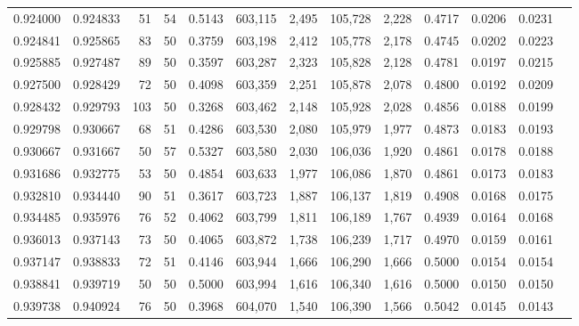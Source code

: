 \begin{tabular}{rrrrrrrrrrrrr}
0.924000 & 0.924833 &    51 &  54 &                                     0.5143 & 603,115 &   2,495 & 105,728 &   2,228 & 0.4717 & 0.0206 & 0.0231 \\
0.924841 & 0.925865 &    83 &  50 &                                     0.3759 & 603,198 &   2,412 & 105,778 &   2,178 & 0.4745 & 0.0202 & 0.0223 \\
0.925885 & 0.927487 &    89 &  50 &                                     0.3597 & 603,287 &   2,323 & 105,828 &   2,128 & 0.4781 & 0.0197 & 0.0215 \\
0.927500 & 0.928429 &    72 &  50 &                                     0.4098 & 603,359 &   2,251 & 105,878 &   2,078 & 0.4800 & 0.0192 & 0.0209 \\
0.928432 & 0.929793 &   103 &  50 &                                     0.3268 & 603,462 &   2,148 & 105,928 &   2,028 & 0.4856 & 0.0188 & 0.0199 \\
0.929798 & 0.930667 &    68 &  51 &                                     0.4286 & 603,530 &   2,080 & 105,979 &   1,977 & 0.4873 & 0.0183 & 0.0193 \\
0.930667 & 0.931667 &    50 &  57 &                                     0.5327 & 603,580 &   2,030 & 106,036 &   1,920 & 0.4861 & 0.0178 & 0.0188 \\
0.931686 & 0.932775 &    53 &  50 &                                     0.4854 & 603,633 &   1,977 & 106,086 &   1,870 & 0.4861 & 0.0173 & 0.0183 \\
0.932810 & 0.934440 &    90 &  51 &                                     0.3617 & 603,723 &   1,887 & 106,137 &   1,819 & 0.4908 & 0.0168 & 0.0175 \\
0.934485 & 0.935976 &    76 &  52 &                                     0.4062 & 603,799 &   1,811 & 106,189 &   1,767 & 0.4939 & 0.0164 & 0.0168 \\
0.936013 & 0.937143 &    73 &  50 &                                     0.4065 & 603,872 &   1,738 & 106,239 &   1,717 & 0.4970 & 0.0159 & 0.0161 \\
0.937147 & 0.938833 &    72 &  51 &                                     0.4146 & 603,944 &   1,666 & 106,290 &   1,666 & 0.5000 & 0.0154 & 0.0154 \\
0.938841 & 0.939719 &    50 &  50 &                                     0.5000 & 603,994 &   1,616 & 106,340 &   1,616 & 0.5000 & 0.0150 & 0.0150 \\
0.939738 & 0.940924 &    76 &  50 &                                     0.3968 & 604,070 &   1,540 & 106,390 &   1,566 & 0.5042 & 0.0145 & 0.0143 \\

\end{tabular}
